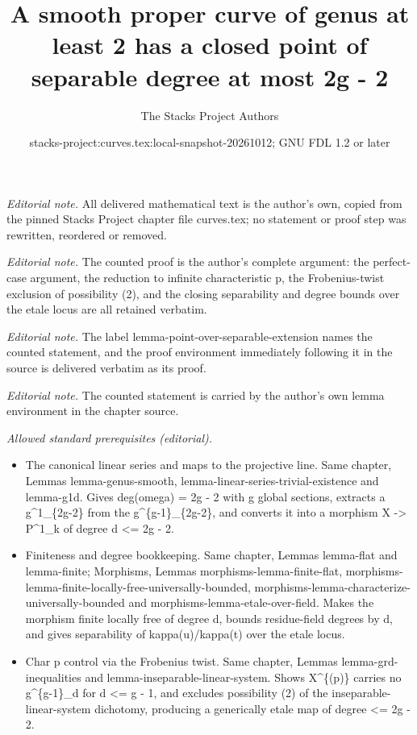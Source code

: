 \documentclass[10pt,a4paper]{amsart}
\title{A smooth proper curve of genus at least 2 has a closed point of separable degree at most 2g - 2}
\author{The Stacks Project Authors}
\date{stacks-project:curves.tex:local-snapshot-20261012; GNU FDL 1.2 or later}
\theoremstyle{plain}
\theoremstyle{definition}
\theoremstyle{remark}
\numberwithin{equation}{subsection}
\begin{document}
\maketitle
\noindent\textit{Editorial note.} All delivered mathematical text is the author's own, copied from the pinned Stacks Project chapter file curves.tex; no statement or proof step was rewritten, reordered or removed.\par\medskip
\noindent\textit{Editorial note.} The counted proof is the author's complete argument: the perfect-case argument, the reduction to infinite characteristic p, the Frobenius-twist exclusion of possibility (2), and the closing separability and degree bounds over the etale locus are all retained verbatim.\par\medskip
\noindent\textit{Editorial note.} The label lemma-point-over-separable-extension names the counted statement, and the proof environment immediately following it in the source is delivered verbatim as its proof.\par\medskip
\noindent\textit{Editorial note.} The counted statement is carried by the author's own lemma environment in the chapter source.\par\medskip
\noindent\textit{Allowed standard prerequisites (editorial).}\begin{itemize}
\item The canonical linear series and maps to the projective line. Same chapter, Lemmas lemma-genus-smooth, lemma-linear-series-trivial-existence and lemma-g1d. Gives deg(omega) = 2g - 2 with g global sections, extracts a g\textasciicircum{}1\_\{2g-2\} from the g\textasciicircum{}\{g-1\}\_\{2g-2\}, and converts it into a morphism X -> P\textasciicircum{}1\_k of degree d <= 2g - 2.
\item Finiteness and degree bookkeeping. Same chapter, Lemmas lemma-flat and lemma-finite; Morphisms, Lemmas morphisms-lemma-finite-flat, morphisms-lemma-finite-locally-free-universally-bounded, morphisms-lemma-characterize-universally-bounded and morphisms-lemma-etale-over-field. Makes the morphism finite locally free of degree d, bounds residue-field degrees by d, and gives separability of kappa(u)/kappa(t) over the etale locus.
\item Char p control via the Frobenius twist. Same chapter, Lemmas lemma-grd-inequalities and lemma-inseparable-linear-system. Shows X\textasciicircum{}\{(p)\} carries no g\textasciicircum{}\{g-1\}\_d for d <= g - 1, and excludes possibility (2) of the inseparable-linear-system dichotomy, producing a generically etale map of degree <= 2g - 2.
\end{itemize}\medskip
\end{document}
